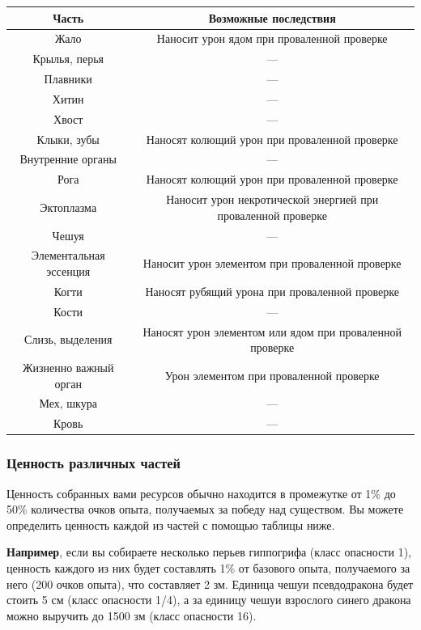 \documentclass[a4paper, 9pt, twocolumn]{book}
\begin{document}
\begin{center}
	
	\begin{tabular}{|c|c|}
		\hline
		\textbf{Часть} & \textbf{Возможные последствия} \\
		\hline
		Жало & Наносит урон ядом при проваленной проверке \\
		\hline
		Крылья, перья & --- \\
		\hline
		Плавники & --- \\
		\hline
		Хитин & --- \\
		\hline
		Хвост & --- \\
		\hline
		Клыки, зубы & Наносят колющий урон при проваленной проверке \\
		\hline
		Внутренние органы & ---  \\
		\hline
		Рога & Наносят колющий урон при проваленной проверке \\
		\hline
		Эктоплазма & Наносит урон некротической энергией при проваленной проверке \\
		\hline
		Чешуя & --- \\
		\hline
		Элементальная эссенция & Наносит урон элементом при проваленной проверке \\
		\hline
		Когти & Наносят рубящий урона при проваленной проверке \\
		\hline
		Кости & --- \\
		\hline
		Слизь, выделения & Наносят урон элементом или ядом при проваленной проверке \\
		\hline
		Жизненно важный орган & Урон элементом при проваленной проверке  \\
		\hline
		Мех, шкура & --- \\
		\hline
		Кровь & --- \\
		\hline
	\end{tabular}

\end{center}
	
	\subsubsection{Ценность различных частей}
	
	Ценность собранных вами ресурсов обычно находится в промежутке от 1\% до 50\% количества очков опыта, получаемых за победу над существом. Вы можете определить ценность каждой из частей с помощью таблицы ниже.
	
	\textbf{Например}, если вы собираете несколько перьев гиппогрифа (класс опасности 1), ценность каждого из них будет составлять 1\% от базового опыта, получаемого за него (200 очков опыта), что составляет 2 зм. Единица чешуи псевдодракона будет стоить 5 см (класс опасности 1/4), а за единицу чешуи взрослого синего дракона можно выручить до 1500 зм (класс опасности 16).
	
\end{document}
